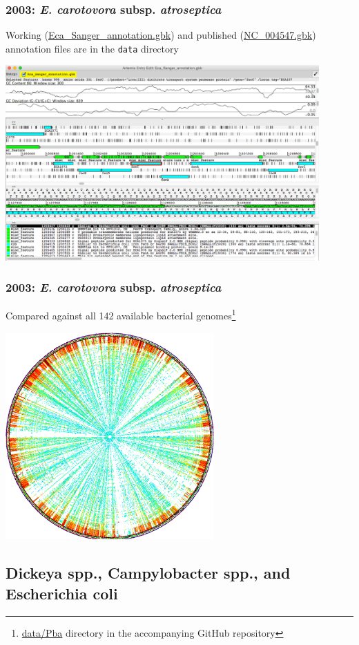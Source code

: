 \begin{frame}
  \frametitle{2003: \textit{E. carotovora} subsp. \textit{atroseptica}}
  Working (\url{Eca_Sanger_annotation.gbk}) and published (\url{NC_004547.gbk}) annotation files are in the \texttt{data} directory
  \begin{center}
    \includegraphics[width=0.9\textwidth]{images/pba_artemis}
  \end{center}    
\end{frame}

\begin{frame}
  \frametitle{2003: \textit{E. carotovora} subsp. \textit{atroseptica}}
  Compared against all 142 available bacterial genomes\footnote{\tiny{\url{data/Pba} directory in the accompanying GitHub repository}}
  \begin{center}
    \includegraphics[width=0.6\textwidth]{images/pba_400_circular}
  \end{center}    
\end{frame}

\subsection{Dickeya spp., Campylobacter spp., and Escherichia coli}

